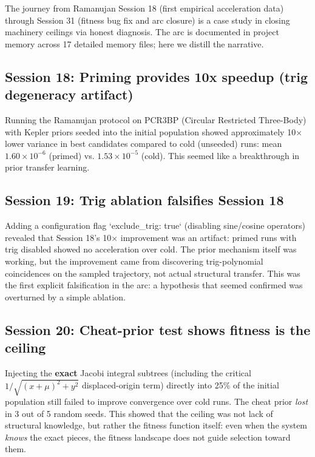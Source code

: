 The journey from Ramanujan Session 18 (first empirical acceleration data) through Session 31 (fitness bug fix and arc closure) is a case study in closing machinery ceilings via honest diagnosis. The arc is documented in project memory across 17 detailed memory files; here we distill the narrative.

\subsection{Session 18: Priming provides 10x speedup (trig degeneracy artifact)}

Running the Ramanujan protocol on PCR3BP (Circular Restricted Three-Body) with Kepler priors seeded into the initial population showed approximately 10× lower variance in best candidates compared to cold (unseeded) runs: mean $1.60 \times 10^{-6}$ (primed) vs. $1.53 \times 10^{-5}$ (cold). This seemed like a breakthrough in prior transfer learning.

\subsection{Session 19: Trig ablation falsifies Session 18}

Adding a configuration flag `exclude_trig: true` (disabling sine/cosine operators) revealed that Session 18's 10× improvement was an artifact: primed runs with trig disabled showed no acceleration over cold. The prior mechanism itself was working, but the improvement came from discovering trig-polynomial coincidences on the sampled trajectory, not actual structural transfer. This was the first explicit falsification in the arc: a hypothesis that seemed confirmed was overturned by a simple ablation.

\subsection{Session 20: Cheat-prior test shows fitness is the ceiling}

Injecting the \textbf{exact} Jacobi integral subtrees (including the critical $1/\sqrt{(x+\mu)^2 + y^2}$ displaced-origin term) directly into 25\% of the initial population still failed to improve convergence over cold runs. The cheat prior \textit{lost} in 3 out of 5 random seeds. This showed that the ceiling was not lack of structural knowledge, but rather the fitness function itself: even when the system \textit{knows} the exact pieces, the fitness landscape does not guide selection toward them.


